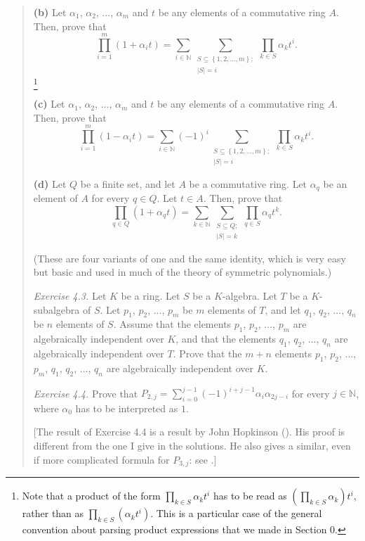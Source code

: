 \documentclass[numbers=enddot,12pt,final,onecolumn,notitlepage]{scrartcl}%
\begin{document}
\begin{quotation}
\textbf{(b)} Let $\alpha_{1}$, $\alpha_{2}$, $...$, $\alpha_{m}$ and $t$ be
any elements of a commutative ring $A$. Then, prove that%
\[
\prod\limits_{i=1}^{m}\left(  1+\alpha_{i}t\right)  =\sum\limits_{i\in
\mathbb{N}}\sum\limits_{\substack{S\subseteq\left\{  1,2,...,m\right\}
;\\\left\vert S\right\vert =i}}\prod\limits_{k\in S}\alpha_{k}t^{i}.
\]
\footnote{Note that a product of the form $\prod\limits_{k\in S}\alpha
_{k}t^{i}$ has to be read as $\left(  \prod\limits_{k\in S}\alpha_{k}\right)
t^{i}$, rather than as $\prod\limits_{k\in S}\left(  \alpha_{k}t^{i}\right)
$. This is a particular case of the general convention about parsing product
expressions that we made in Section 0.}

\textbf{(c)} Let $\alpha_{1}$, $\alpha_{2}$, $...$, $\alpha_{m}$ and $t$ be
any elements of a commutative ring $A$. Then, prove that%
\[
\prod\limits_{i=1}^{m}\left(  1-\alpha_{i}t\right)  =\sum\limits_{i\in
\mathbb{N}}\left(  -1\right)  ^{i}\sum\limits_{\substack{S\subseteq\left\{
1,2,...,m\right\}  ;\\\left\vert S\right\vert =i}}\prod\limits_{k\in S}%
\alpha_{k}t^{i}.
\]


\textbf{(d)} Let $Q$ be a finite set, and let $A$ be a commutative ring. Let
$\alpha_{q}$ be an element of $A$ for every $q\in Q$. Let $t\in A$. Then,
prove that%
\[
\prod\limits_{q\in Q}\left(  1+\alpha_{q}t\right)  =\sum\limits_{k\in
\mathbb{N}}\sum\limits_{\substack{S\subseteq Q;\\\left\vert S\right\vert
=k}}\prod\limits_{q\in S}\alpha_{q}t^{k}.
\]


(These are four variants of one and the same identity, which is very easy but
basic and used in much of the theory of symmetric polynomials.)

\textit{Exercise 4.3.} Let $K$ be a ring. Let $S$ be a $K$-algebra. Let $T$ be
a $K$-subalgebra of $S$. Let $p_{1}$, $p_{2}$, $...$, $p_{m}$ be $m$ elements
of $T$, and let $q_{1}$, $q_{2}$, $...$, $q_{n}$ be $n$ elements of $S$.
Assume that the elements $p_{1}$, $p_{2}$, $...$, $p_{m}$ are algebraically
independent over $K$, and that the elements $q_{1}$, $q_{2}$, $...$, $q_{n}$
are algebraically independent over $T$. Prove that the $m+n$ elements $p_{1}$,
$p_{2}$, $...$, $p_{m}$, $q_{1}$, $q_{2}$, $...$, $q_{n}$ are algebraically
independent over $K$.

\textit{Exercise 4.4.} Prove that $P_{2,j}=\sum\limits_{i=0}^{j-1}\left(
-1\right)  ^{i+j-1}\alpha_{i}\alpha_{2j-i}$ for every $j\in\mathbb{N}$, where
$\alpha_{0}$ has to be interpreted as $1$.

[The result of Exercise 4.4 is a result by John Hopkinson (\cite[Proposition
2.1]{Hopkin06}). His proof is different from the one I give in the solutions.
He also gives a similar, even if more complicated formula for $P_{3,j}$: see
\cite[Proposition 2.2]{Hopkin06}.]
\end{quotation}
\end{document}
